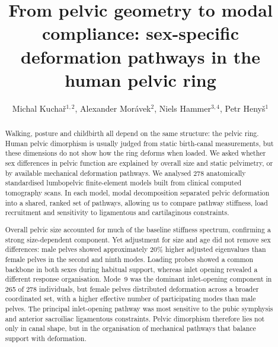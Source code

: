 \documentclass[openacc]{rsproca_new}
\begin{document}
\title{From pelvic geometry to modal compliance: sex-specific deformation pathways in the human pelvic ring}

\author{Michal Kucha\v{r}$^{1,2}$, Alexander Mor\'{a}vek$^{2}$, Niels Hammer$^{3,4}$, Petr Heny\v{s}$^{1}$}

\address{$^{1}$Institute of New Technologies and Applied Informatics, Faculty of Mechatronics, Informatics and Interdisciplinary Studies, Technical University of Liberec, Liberec, Czech Republic\\
$^{2}$Department of Anatomy, Faculty of Medicine in Hradec Kr\'{a}lov\'{e}, Charles University, Hradec Kr\'{a}lov\'{e}, Czech Republic\\
$^{3}$Division of Macroscopic and Clinical Anatomy, Gottfried Schatz Research Center, Medical University of Graz, Graz, Austria\\
$^{4}$Department of Orthopedic and Trauma Surgery, University of Leipzig, Leipzig, Germany; Division of Biomechatronics, Fraunhofer IWU, Dresden, Germany}

\subject{biomechanics, evolutionary anthropology, obstetrics}




\begin{abstract}
Walking, posture and childbirth all depend on the same structure: the pelvic ring. Human pelvic dimorphism is usually judged from static birth-canal measurements, but these dimensions do not show how the ring deforms when loaded. We asked whether sex differences in pelvic function are explained by overall size and static pelvimetry, or by available mechanical deformation pathways. We analysed 278 anatomically standardised lumbopelvic finite-element models built from clinical computed tomography scans. In each model, modal decomposition separated pelvic deformation into a shared, ranked set of pathways, allowing us to compare pathway stiffness, load recruitment and sensitivity to ligamentous and cartilaginous constraints.

Overall pelvic size accounted for much of the baseline stiffness spectrum, confirming a strong size-dependent component. Yet adjustment for size and age did not remove sex differences: male pelves showed approximately 20\% higher adjusted eigenvalues than female pelves in the second and ninth modes. Loading probes showed a common backbone in both sexes during habitual support, whereas inlet opening revealed a different response organisation. Mode~9 was the dominant inlet-opening component in 265 of 278 individuals, but female pelves distributed deformation across a broader coordinated set, with a higher effective number of participating modes than male pelves. The principal inlet-opening pathway was most sensitive to the pubic symphysis and anterior sacroiliac ligamentous constraints. Pelvic dimorphism therefore lies not only in canal shape, but in the organisation of mechanical pathways that balance support with deformation.
\end{abstract}
\end{document}
